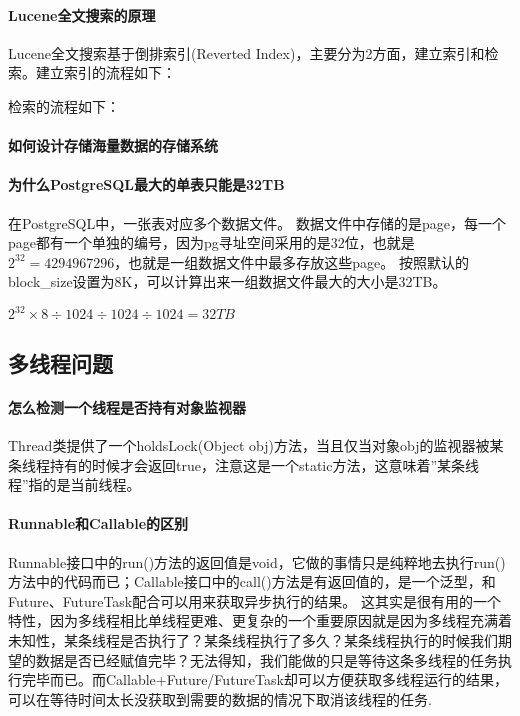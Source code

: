 \documentclass[../../../interview-questions.tex]{subfiles}
\begin{document}
\paragraph{Lucene全文搜索的原理}

Lucene全文搜索基于倒排索引(Reverted Index)，主要分为2方面，建立索引和检索。建立索引的流程如下：


检索的流程如下：

\paragraph{如何设计存储海量数据的存储系统}

\paragraph{为什么PostgreSQL最大的单表只能是32TB}

在PostgreSQL中，一张表对应多个数据文件。
数据文件中存储的是page，每一个page都有一个单独的编号，因为pg寻址空间采用的是32位，也就是$2^{32}=4294967296$，也就是一组数据文件中最多存放这些page。
按照默认的block\_size设置为8K，可以计算出来一组数据文件最大的大小是32TB。


$2^{32} \times 8 \div 1024 \div 1024 \div 1024 = 32TB$


\subsection{多线程问题}

\paragraph{怎么检测一个线程是否持有对象监视器}

Thread类提供了一个holdsLock(Object obj)方法，当且仅当对象obj的监视器被某条线程持有的时候才会返回true，注意这是一个static方法，这意味着”某条线程”指的是当前线程。

\paragraph{Runnable和Callable的区别}

Runnable接口中的run()方法的返回值是void，它做的事情只是纯粹地去执行run()方法中的代码而已；Callable接口中的call()方法是有返回值的，是一个泛型，和Future、FutureTask配合可以用来获取异步执行的结果。
这其实是很有用的一个特性，因为多线程相比单线程更难、更复杂的一个重要原因就是因为多线程充满着未知性，某条线程是否执行了？某条线程执行了多久？某条线程执行的时候我们期望的数据是否已经赋值完毕？无法得知，我们能做的只是等待这条多线程的任务执行完毕而已。而Callable+Future/FutureTask却可以方便获取多线程运行的结果，可以在等待时间太长没获取到需要的数据的情况下取消该线程的任务.
\end{document}
